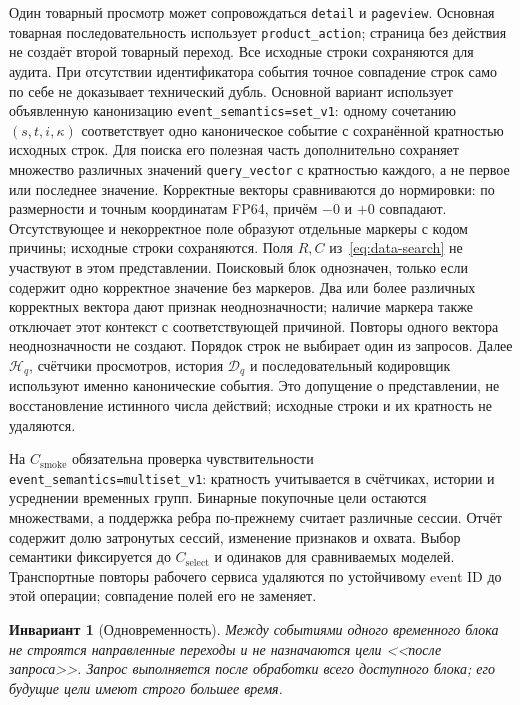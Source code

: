 \documentclass[12pt,a4paper]{article}
\newcommand{\code}[1]{{\ttfamily\small\nolinkurl{#1}}}
\theoremstyle{plainru}
\newtheorem{invariant}{Инвариант}[section]
\begin{document}
Один товарный просмотр может сопровождаться \code{detail} и
\code{pageview}. Основная товарная последовательность использует
\code{product_action}; страница без действия не создаёт второй
товарный переход. Все исходные строки сохраняются для аудита.
При отсутствии идентификатора события точное совпадение строк само по себе
не доказывает технический дубль. Основной вариант использует объявленную
канонизацию \code{event_semantics=set_v1}: одному сочетанию
\((s,t,i,\kappa)\) соответствует одно каноническое событие с сохранённой
кратностью исходных строк. Для поиска его полезная часть дополнительно
сохраняет множество различных значений \code{query_vector} с кратностью
каждого, а не первое или последнее значение.
\label{sec:data-search-canonicalization}
Корректные векторы сравниваются до нормировки: по размерности и точным
координатам FP64, причём $-0$ и $+0$ совпадают. Отсутствующее и
некорректное поле образуют отдельные маркеры с кодом причины;
исходные строки сохраняются.
Поля $R,C$ из~\eqref{eq:data-search} не участвуют в этом представлении.
Поисковый блок однозначен, только если содержит одно корректное значение
без маркеров. Два или более различных корректных вектора дают
признак неоднозначности; наличие маркера также отключает этот контекст
с соответствующей причиной. Повторы одного вектора неоднозначности
не создают. Порядок строк не выбирает один из запросов.
Далее $\mathcal H_q$, счётчики просмотров,
история $\mathcal D_q$ и последовательный кодировщик используют именно
канонические события. Это допущение о представлении, не восстановление
истинного числа действий; исходные строки и их кратность не удаляются.

На $C_{\mathrm{smoke}}$ обязательна проверка чувствительности
\code{event_semantics=multiset_v1}: кратность учитывается в счётчиках,
истории и усреднении временных групп. Бинарные покупочные цели остаются
множествами, а поддержка ребра по-прежнему считает различные сессии.
Отчёт содержит долю затронутых сессий, изменение признаков и охвата.
Выбор семантики фиксируется до $C_{\mathrm{select}}$ и одинаков для
сравниваемых моделей. Транспортные повторы рабочего сервиса удаляются по
устойчивому event ID до этой операции; совпадение полей его не заменяет.

\begin{invariant}[Одновременность]
Между событиями одного временного блока не строятся направленные
переходы и не назначаются цели <<после запроса>>. Запрос выполняется
после обработки всего доступного блока; его будущие цели имеют
строго большее время.
\end{invariant}
\end{document}
